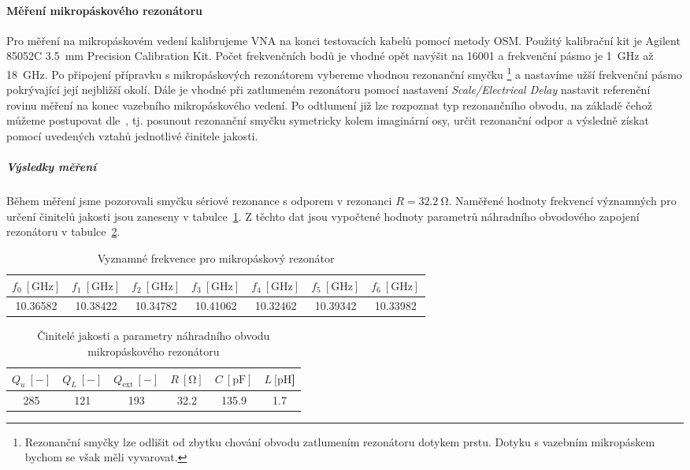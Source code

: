 \documentclass[11pt,a4paper]{article}
\newcommand{\Ohm}{\mathrm{\Omega}}
\newcommand{\GHz}{\mathrm{GHz}}
\begin{document}
\paragraph*{Měření mikropáskového rezonátoru} Pro měření na mikropáskovém vedení kalibrujeme VNA na konci testovacích kabelů pomocí metody OSM. Použitý kalibrační kit je Agilent 85052C 3.5~mm Precision Calibration Kit. Počet frekvenčních bodů je vhodné opět navýšit na 16001 a frekvenční pásmo je 1~GHz až 18~GHz. Po připojení přípravku s mikropáskových rezonátorem vybereme vhodnou rezonanční smyčku%
    \footnote{Rezonanční smyčky lze odlišit od zbytku chování obvodu zatlumením rezonátoru dotykem prstu. Dotyku s vazebním mikropáskem bychom se však měli vyvarovat.}
a nastavíme užší frekvenční pásmo pokrývající její nejbližší okolí. Dále je vhodné při zatlumeném rezonátoru pomocí nastavení \emph{Scale/Electrical Delay} nastavit referenční rovinu měření na konec vazebního mikropáskového vedení. Po odtlumení již lze rozpoznat typ rezonančního obvodu, na základě čehož můžeme postupovat dle~\cite{tysl:mereni-pri-velmi-vysokych-kmitoctech}, tj. posunout rezonanční smyčku symetricky kolem imaginární osy, určit rezonanční odpor a výsledně získat pomocí uvedených vztahů jednotlivé činitele jakosti.

\subparagraph*{Výsledky měření} Během měření jsme pozorovali smyčku sériové rezonance s odporem v rezonanci $R = 32.2\ \Ohm$. Naměřené hodnoty frekvencí významných pro určení činitelů jakosti jsou zaneseny v tabulce~\ref{table:mikropaskovy-rezonator-frekvence}. Z těchto dat jsou vypočtené hodnoty parametrů náhradního obvodového zapojení rezonátoru v tabulce~\ref{table:mikropaskovy-rezonator-hodnoty}.
\begin{table}[!ht]
\centering
\begin{tabular}{|c|c|c|c|c|c|c|}
    \hline
    $f_0\ [\GHz]$ & $f_1\ [\GHz]$ & $f_2\ [\GHz]$ & $f_3\ [\GHz]$ & $f_4\ [\GHz]$ & $f_5\ [\GHz]$ & $f_6\ [\GHz]$\\
    \hline\hline
    10.36582 & 10.38422 & 10.34782 & 10.41062 & 10.32462 & 10.39342 & 10.33982\\
    \hline
\end{tabular}
\caption{\label{table:mikropaskovy-rezonator-frekvence}Vyznamné frekvence pro mikropáskový rezonátor}
\end{table}
\begin{table}[!ht]
\centering
\begin{tabular}{|c|c|c|c|c|c|}
    \hline
    $Q_u\ [-]$ & $Q_L\ [-]$ & $Q_{\mathrm{ext}}\ [-]$ & $R\ [\mathrm{\Omega}]$ & $C\ [\mathrm{pF}]$ & $L\ [\mathrm{pH}$]\\
    \hline\hline
    285 & 121 & 193 & 32.2 & 135.9 & 1.7\\
    \hline
\end{tabular}
\caption{\label{table:mikropaskovy-rezonator-hodnoty}Činitelé jakosti a parametry náhradního obvodu mikropáskového rezonátoru}
\end{table}
\end{document}
